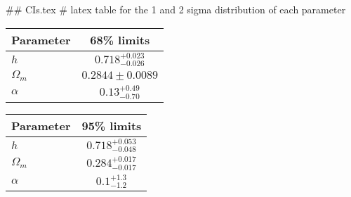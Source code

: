 ## CIs.tex
# latex table for the 1 and 2 sigma distribution of each parameter

\begin{tabular} { l  c}
 Parameter &  68\% limits\\
\hline
{\boldmath$h              $} & $0.718^{+0.023}_{-0.026}   $\\
{\boldmath$\Omega_m       $} & $0.2844\pm 0.0089          $\\
{\boldmath$\alpha         $} & $0.13^{+0.49}_{-0.70}      $\\
\hline
\end{tabular}

\begin{tabular} { l  c}
 Parameter &  95\% limits\\
\hline
{\boldmath$h              $} & $0.718^{+0.053}_{-0.048}   $\\
{\boldmath$\Omega_m       $} & $0.284^{+0.017}_{-0.017}   $\\
{\boldmath$\alpha         $} & $0.1^{+1.3}_{-1.2}         $\\
\hline
\end{tabular}
